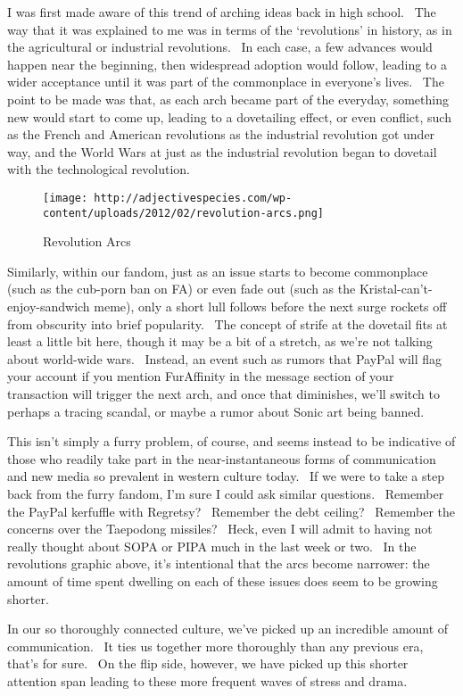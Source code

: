 I was first made aware of this trend of arching ideas back in high
school. ~The way that it was explained to me was in terms of the
`revolutions' in history, as in the agricultural or industrial
revolutions. ~In each case, a few advances would happen near the
beginning, then widespread adoption would follow, leading to a wider
acceptance until it was part of the commonplace in everyone's lives.
~The point to be made was that, as each arch became part of the
everyday, something new would start to come up, leading to a dovetailing
effect, or even conflict, such as the French and American revolutions as
the industrial revolution got under way, and the World Wars at just as
the industrial revolution began to dovetail with the technological
revolution.

\begin{figure}[htbp]
\centering
\texttt{[image: http://adjectivespecies.com/wp-content/uploads/2012/02/revolution-arcs.png]}
\caption{Revolution Arcs}
\end{figure}

Similarly, within our fandom, just as an issue starts to become
commonplace (such as the cub-porn ban on FA) or even fade out (such as
the Kristal-can't-enjoy-sandwich meme), only a short lull follows before
the next surge rockets off from obscurity into brief popularity. ~The
concept of strife at the dovetail fits at least a little bit here,
though it may be a bit of a stretch, as we're not talking about
world-wide wars. ~Instead, an event such as rumors that PayPal will flag
your account if you mention FurAffinity in the message section of your
transaction will trigger the next arch, and once that diminishes, we'll
switch to perhaps a tracing scandal, or maybe a rumor about Sonic art
being banned.

This isn't simply a furry problem, of course, and seems instead to be
indicative of those who readily take part in the near-instantaneous
forms of communication and new media so prevalent in western culture
today. ~If we were to take a step back from the furry fandom, I'm sure I
could ask similar questions. ~Remember the PayPal kerfuffle with
Regretsy? ~Remember the debt ceiling? ~Remember the concerns over the
Taepodong missiles? ~Heck, even I will admit to having not really
thought about SOPA or PIPA much in the last week or two. ~In the
revolutions graphic above, it's intentional that the arcs become
narrower: the amount of time spent dwelling on each of these issues does
seem to be growing shorter.

In our so thoroughly connected culture, we've picked up an incredible
amount of communication. ~It ties us together more thoroughly than any
previous era, that's for sure. ~On the flip side, however, we have
picked up this shorter attention span leading to these more frequent
waves of stress and drama.

